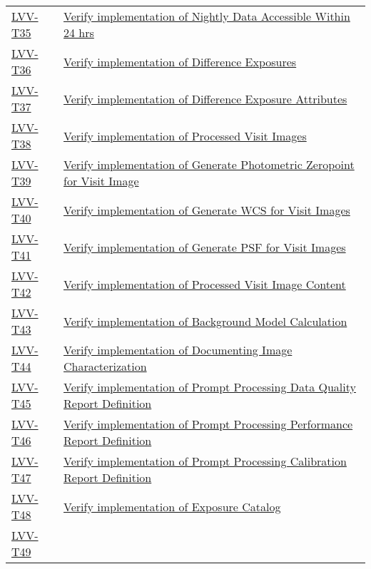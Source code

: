 \begin{longtable}[]{p{3cm}p{13cm}}
    \hyperref[lvv-t35]{LVV-T35} &
    \href{https://jira.lsstcorp.org/secure/Tests.jspa\#/testCase/LVV-T35}{Verify implementation of Nightly Data Accessible Within 24 hrs} \tabularnewline
    \hyperref[lvv-t36]{LVV-T36} &
    \href{https://jira.lsstcorp.org/secure/Tests.jspa\#/testCase/LVV-T36}{Verify implementation of Difference Exposures} \tabularnewline
    \hyperref[lvv-t37]{LVV-T37} &
    \href{https://jira.lsstcorp.org/secure/Tests.jspa\#/testCase/LVV-T37}{Verify implementation of Difference Exposure Attributes} \tabularnewline
    \hyperref[lvv-t38]{LVV-T38} &
    \href{https://jira.lsstcorp.org/secure/Tests.jspa\#/testCase/LVV-T38}{Verify implementation of Processed Visit Images} \tabularnewline
    \hyperref[lvv-t39]{LVV-T39} &
    \href{https://jira.lsstcorp.org/secure/Tests.jspa\#/testCase/LVV-T39}{Verify implementation of Generate Photometric Zeropoint for Visit Image} \tabularnewline
    \hyperref[lvv-t40]{LVV-T40} &
    \href{https://jira.lsstcorp.org/secure/Tests.jspa\#/testCase/LVV-T40}{Verify implementation of Generate WCS for Visit Images} \tabularnewline
    \hyperref[lvv-t41]{LVV-T41} &
    \href{https://jira.lsstcorp.org/secure/Tests.jspa\#/testCase/LVV-T41}{Verify implementation of Generate PSF for Visit Images} \tabularnewline
    \hyperref[lvv-t42]{LVV-T42} &
    \href{https://jira.lsstcorp.org/secure/Tests.jspa\#/testCase/LVV-T42}{Verify implementation of Processed Visit Image Content} \tabularnewline
    \hyperref[lvv-t43]{LVV-T43} &
    \href{https://jira.lsstcorp.org/secure/Tests.jspa\#/testCase/LVV-T43}{Verify implementation of Background Model Calculation} \tabularnewline
    \hyperref[lvv-t44]{LVV-T44} &
    \href{https://jira.lsstcorp.org/secure/Tests.jspa\#/testCase/LVV-T44}{Verify implementation of  Documenting Image Characterization} \tabularnewline
    \hyperref[lvv-t45]{LVV-T45} &
    \href{https://jira.lsstcorp.org/secure/Tests.jspa\#/testCase/LVV-T45}{Verify implementation of Prompt Processing Data Quality Report Definition} \tabularnewline
    \hyperref[lvv-t46]{LVV-T46} &
    \href{https://jira.lsstcorp.org/secure/Tests.jspa\#/testCase/LVV-T46}{Verify implementation of Prompt Processing Performance Report Definition} \tabularnewline
    \hyperref[lvv-t47]{LVV-T47} &
    \href{https://jira.lsstcorp.org/secure/Tests.jspa\#/testCase/LVV-T47}{Verify  implementation of Prompt Processing Calibration Report Definition} \tabularnewline
    \hyperref[lvv-t48]{LVV-T48} &
    \href{https://jira.lsstcorp.org/secure/Tests.jspa\#/testCase/LVV-T48}{Verify implementation of Exposure Catalog} \tabularnewline
    \hyperref[lvv-t49]{LVV-T49} &

\end{longtable}
